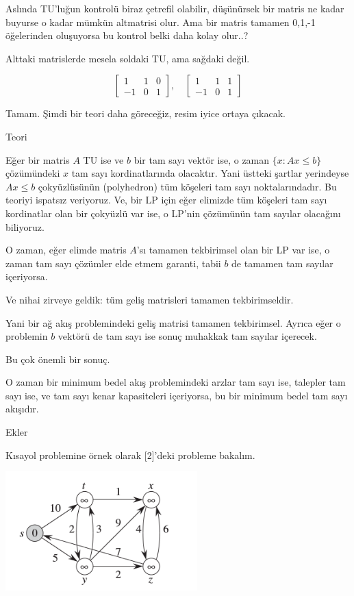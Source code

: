 \documentclass[12pt,fleqn]{article}\usepackage{../../common}
\begin{document}
Aslında TU'luğun kontrolü biraz çetrefil olabilir, düşünürsek bir matris ne
kadar buyurse o kadar mümkün altmatrisi olur. Ama bir matris tamamen 0,1,-1
öğelerinden oluşuyorsa bu kontrol belki daha kolay olur..? 

Alttaki matrislerde mesela soldaki TU, ama sağdaki değil. 

$$
\left[\begin{array}{ccc}
1 & 1 & 0 \\ -1 & 0 & 1
\end{array}\right], \quad 
\left[\begin{array}{ccc}
1 & 1 & 1 \\ -1 & 0 & 1
\end{array}\right]
$$

Tamam. Şimdi bir teori daha göreceğiz, resim iyice ortaya çıkacak. 

Teori

Eğer bir matris $A$ TU ise ve $b$ bir tam sayı vektör ise, o zaman
$\{ x : Ax \le b\}$ çözümündeki $x$ tam sayı kordinatlarında olacaktır.
Yani üstteki şartlar yerindeyse $Ax \le b$ çokyüzlüsünün (polyhedron) tüm
köşeleri tam sayı noktalarındadır. Bu teoriyi ispatsız veriyoruz. Ve, bir LP
için eğer elimizde tüm köşeleri tam sayı kordinatlar olan bir çokyüzlü var
ise, o LP'nin çözümünün tam sayılar olacağını biliyoruz.

O zaman, eğer elimde matris $A$'sı tamamen tekbirimsel olan bir LP var ise,
o zaman tam sayı çözümler elde etmem garanti, tabii $b$ de tamamen tam
sayılar içeriyorsa. 

Ve nihai zirveye geldik: tüm geliş matrisleri tamamen tekbirimseldir. 

Yani bir ağ akış problemindeki geliş matrisi tamamen tekbirimsel. Ayrıca
eğer o problemin $b$ vektörü de tam sayı ise sonuç muhakkak tam sayılar
içerecek. 

Bu çok önemli bir sonuç. 

O zaman bir minimum bedel akış problemindeki arzlar tam sayı ise, talepler
tam sayı ise, ve tam sayı kenar kapasiteleri içeriyorsa, bu bir minimum
bedel tam sayı akışıdır. 

Ekler

Kısayol problemine örnek olarak [2]'deki probleme bakalım.

\includegraphics[width=20em]{dijks_03.png}
\end{document}
